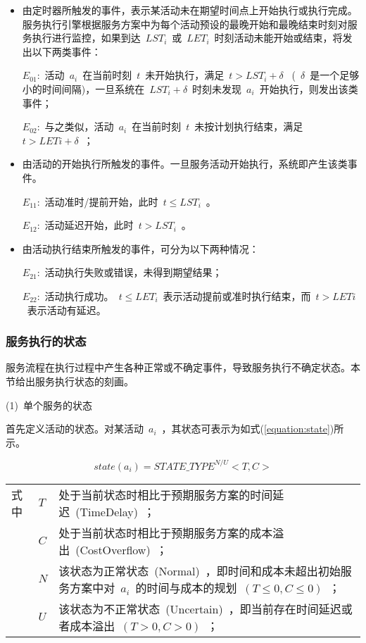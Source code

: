 \begin{itemize}
\item 由定时器所触发的事件，表示某活动未在期望时间点上开始执行或执行完成。服务执行引擎根据服务方案中为每个活动预设的最晚开始和最晚结束时刻对服务执行进行监控，如果到达~$LST_i$~或~$LET_i$~时刻活动未能开始或结束，将发出以下两类事件：

$E_{01}$:~活动~$a_i$~在当前时刻~$t$~未开始执行，满足~$t>LST_i+\delta$~ (~$\delta$~是一个足够小的时间间隔)，一旦系统在~$LST_i+\delta$~时刻未发现~$a_i$~开始执行，则发出该类事件；

$E_{02}$:~与之类似，活动~$a_i$~在当前时刻~$t$~未按计划执行结束，满足~$t>LETi+\delta$~；

\item 由活动的开始执行所触发的事件。一旦服务活动开始执行，系统即产生该类事件。

$E_{11}$:~活动准时/提前开始，此时~$t\le LST_i$~。

$E_{12}$:~活动延迟开始，此时~$t>LST_i$~。

\item 由活动执行结束所触发的事件，可分为以下两种情况：

$E_{21}$:~活动执行失败或错误，未得到期望结果；

$E_{22}$:~活动执行成功。~$t\le LET_i$~表示活动提前或准时执行结束，而~$t>LETi$~表示活动有延迟。

\end{itemize}


\subsubsection{服务执行的状态} \label{sec:service_state}

服务流程在执行过程中产生各种正常或不确定事件，导致服务执行不确定状态。本节给出服务执行状态的刻画。

(1)~单个服务的状态

首先定义活动的状态。对某活动~$a_i$~，其状态可表示为如式(\ref{equation:state})所示。

\begin{equation}\label{equation:state}
state(a_i)=STATE\_TYPE^{N/U}<T, C>
\end{equation}
\begin{tabularx}{\textwidth}{@{}l@{\quad}l@{\pozhehao }X@{}}
    式中
    & $T$ & 处于当前状态时相比于预期服务方案的时间延迟~(TimeDelay)~；\\
    & $C$ & 处于当前状态时相比于预期服务方案的成本溢出~(CostOverflow)~；\\
    & $N$ & 该状态为正常状态~(Normal)~，即时间和成本未超出初始服务方案中对~$a_i$~的时间与成本的规划~$(T\le 0, C\le 0)$~；\\
    & $U$ & 该状态为不正常状态~(Uncertain)~，即当前存在时间延迟或者成本溢出~$(T>0, C>0)$~；
\end{tabularx}\vspace{\wordsep}


